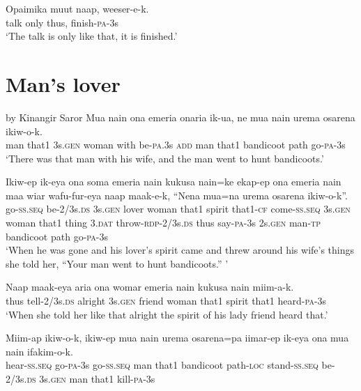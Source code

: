 \ea\label{ex:a:x31}
\gll  Opaimika  muut  naap,  weeser-e-k. \\
talk  only  thus,  finish-\textsc{pa}-3s \\
\glt ‘The talk is only like that, it is finished.’ \\
\z


\setcounter{equation}{0}
\section{ Man’s lover}
   by Kinangir Saror
\ea\label{ex:a:x2}
\gll  Mua  nain  ona  emeria  onaria  ik-ua,  ne  mua  nain  urema  osarena  ikiw-o-k. \\
man  that1  3s.\textsc{gen}  woman  with  be-\textsc{pa}.3s  \textsc{add}  man  that1  bandicoot  path  go-\textsc{pa}-3s \\


\glt ‘There was that man with his wife, and the man went to hunt bandicoots.’ \\
\z


\ea\label{ex:a:x3}
\gll  Ikiw-ep  ik-eya  ona  soma  emeria  nain  kukusa  nain=ke        ekap-ep  ona  emeria  nain  maa  wiar  wafu-fur-eya                 naap  maak-e-k,  “Nena  mua=na  urema  osarena  ikiw-o-k”. \\
go-\textsc{ss.seq}  be-2/3s.\textsc{ds}  3s.\textsc{gen}  lover  woman  that1  spirit  that1-\textsc{cf}   come-\textsc{ss.seq}  3s.\textsc{gen}  woman  that1  thing  3.\textsc{dat}  throw-\textsc{rdp}-2/3s.\textsc{ds}  thus  say-\textsc{pa}-3s  2s.\textsc{gen}  man-\textsc{tp}  bandicoot  path  go-\textsc{pa}-3s \\




\glt ‘When he was gone and his lover’s spirit came and threw around his wife’s things she told her, “Your man went to hunt bandicoots.” ’ \\
\z


\ea\label{ex:a:x4}
\gll  Naap  maak-eya  aria  ona  womar  emeria  nain  kukusa  nain  miim-a-k. \\
thus  tell-2/3s.\textsc{ds}  alright  3s.\textsc{gen}  friend  woman  that1  spirit  that1  heard-\textsc{pa}-3s \\
\glt ‘When she told her like that alright the spirit of his lady friend heard that.’ \\
\z


\ea\label{ex:a:x5}
\gll  Miim-ap  ikiw-o-k,  ikiw-ep  mua  nain  urema  osarena=pa    iimar-ep  ik-eya  ona  mua  nain  ifakim-o-k. \\
hear-\textsc{ss.seq}  go-\textsc{pa}-3s  go-\textsc{ss.seq}  man  that1  bandicoot  path-\textsc{loc}  stand-\textsc{ss.seq}  be-2/3s.\textsc{ds}  3s.\textsc{gen}  man  that1  kill-\textsc{pa}-3s \\


